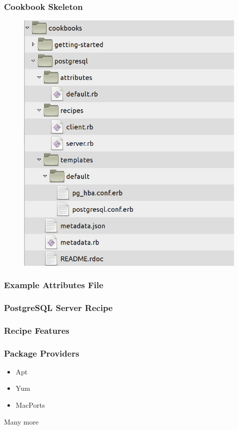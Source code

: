 \documentclass[16pt]{beamer}
\begin{document}
\begin{frame}
  \frametitle{Cookbook Skeleton}
  \begin{figure}
    \includegraphics[width=0.6\linewidth]{images/cookbook-skeleton}
  \end{figure}
\end{frame}

\begin{frame}
  \frametitle{Example Attributes File}
  \begin{footnotesize}
    
    \label{postgres_attributes}
  \end{footnotesize}
\end{frame}

\begin{frame}
  \frametitle{PostgreSQL Server Recipe}
  \begin{footnotesize}
    
    \label{postgres_server_recipe_simple}
    \end{footnotesize}
\end{frame}

\begin{frame}
  \frametitle{Recipe Features}
  \begin{footnotesize}
    
    \label{postgres_server_recipe}
    \end{footnotesize}
\end{frame}

\begin{frame}
  \frametitle{Package Providers}
  \begin{itemize}
    \item Apt
    \item Yum
    \item MacPorts
  \end{itemize}
  \pause
  \begin{center}
    \large Many more
  \end{center}
\end{frame}
\end{document}
